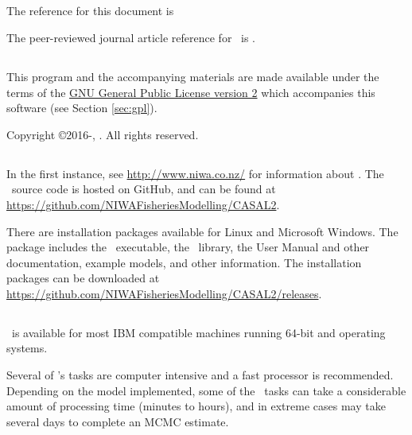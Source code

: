 \subsection{}

The reference for this document is \ManualRef

The peer-reviewed journal article reference for \CNAME\ is \citep{doonan_casal2}.

\subsection{}

This program and the accompanying materials are made available under the terms of the \href{http://www.opensource.org/licenses/GPL-2.0}{GNU General Public License version 2} which accompanies this software (see Section \ref{sec:gpl}).

Copyright \copyright 2016-\SourceControlYearDoc, \href{http://www.niwa.co.nz}{\Organisation}. All rights reserved.

\subsection{}

In the first instance, see \url{http://www.niwa.co.nz/} for information about \CNAME . The \CNAME\ source code is hosted on GitHub, and can be found at \url{https://github.com/NIWAFisheriesModelling/CASAL2}.

There are installation packages available for Linux and Microsoft Windows.  The package includes the \CNAME\ executable, the \R\ library, the User Manual and other documentation, example models, and other information. The installation packages can be downloaded at \url{https://github.com/NIWAFisheriesModelling/CASAL2/releases}.

\subsection{}

\CNAME\ is available for most IBM compatible machines running 64-bit  and  operating systems.

Several of \CNAME's tasks are computer intensive and a fast processor is recommended. Depending on the model implemented, some of the \CNAME\ tasks can take a considerable amount of processing time (minutes to hours), and in extreme cases may take several days to complete an MCMC estimate. 

